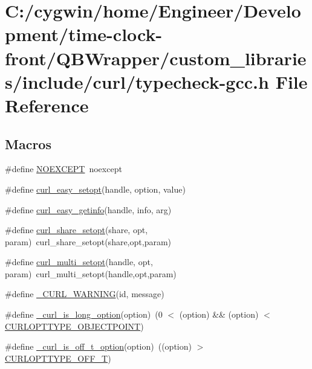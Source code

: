 \hypertarget{typecheck-gcc_8h}{}\section{C\+:/cygwin/home/\+Engineer/\+Development/time-\/clock-\/front/\+Q\+B\+Wrapper/custom\+\_\+libraries/include/curl/typecheck-\/gcc.h File Reference}
\label{typecheck-gcc_8h}
\subsection*{Macros}
\begin{DoxyCompactItemize}
\item 
\#define \hyperlink{typecheck-gcc_8h_a10a59554805ac7ce3905fd3540f98137}{N\+O\+E\+X\+C\+E\+P\+T}~noexcept
\item 
\#define \hyperlink{typecheck-gcc_8h_af8d527555aeac344caa3754445c6ecba}{curl\+\_\+easy\+\_\+setopt}(handle,  option,  value)
\item 
\#define \hyperlink{typecheck-gcc_8h_a978f4e7a75943f3c2a518eb72da213f2}{curl\+\_\+easy\+\_\+getinfo}(handle,  info,  arg)
\item 
\#define \hyperlink{typecheck-gcc_8h_a3770cd3713e7cd0f49af3c076d58805a}{curl\+\_\+share\+\_\+setopt}(share,  opt,  param)~curl\+\_\+share\+\_\+setopt(share,opt,param)
\item 
\#define \hyperlink{typecheck-gcc_8h_afc081c3dd70db2f2641dd96d2513d8d3}{curl\+\_\+multi\+\_\+setopt}(handle,  opt,  param)~curl\+\_\+multi\+\_\+setopt(handle,opt,param)
\item 
\#define \hyperlink{typecheck-gcc_8h_adf5788b674ae99d7ee08c5fefa675609}{\+\_\+\+C\+U\+R\+L\+\_\+\+W\+A\+R\+N\+I\+N\+G}(id,  message)
\item 
\#define \hyperlink{typecheck-gcc_8h_ad0023d3e06ec2f748431e094e6f6aa10}{\+\_\+curl\+\_\+is\+\_\+long\+\_\+option}(option)~(0 $<$ (option) \&\& (option) $<$ \hyperlink{curl_8h_a88edcf8f9aaf67683b27caca050e87b6}{C\+U\+R\+L\+O\+P\+T\+T\+Y\+P\+E\+\_\+\+O\+B\+J\+E\+C\+T\+P\+O\+I\+N\+T})
\item 
\#define \hyperlink{typecheck-gcc_8h_a0452c43ac04346025736e5082cbd8e14}{\+\_\+curl\+\_\+is\+\_\+off\+\_\+t\+\_\+option}(option)~((option) $>$ \hyperlink{curl_8h_ac8bad04621a0523755477f782b7a656a}{C\+U\+R\+L\+O\+P\+T\+T\+Y\+P\+E\+\_\+\+O\+F\+F\+\_\+\+T})

\end{DoxyCompactItemize}
